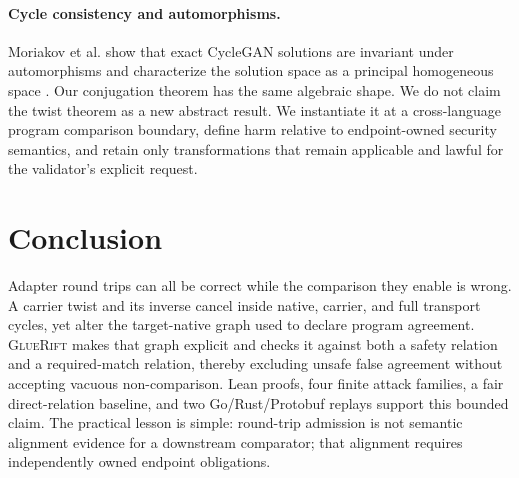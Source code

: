 \documentclass[sigconf,anonymous,review]{acmart}
\newcommand{\sys}{\textsc{GlueRift}\xspace}
\begin{document}
\paragraph{Cycle consistency and automorphisms.}
Moriakov et al. show that exact CycleGAN solutions are invariant under
automorphisms and characterize the solution space as a principal
homogeneous space \cite{moriakov2020cyclegan}.  Our conjugation theorem
has the same algebraic shape.  We do not claim the twist theorem as a
new abstract result.  We instantiate it at a cross-language program
comparison boundary, define harm relative to endpoint-owned security
semantics, and retain only transformations that remain applicable and
lawful for the validator's explicit request.

\section{Conclusion}

Adapter round trips can all be correct while the comparison they enable
is wrong.  A carrier twist and its inverse cancel inside native,
carrier, and full transport cycles, yet alter the target-native graph
used to declare program agreement.  \sys makes that graph explicit and
checks it against both a safety relation and a required-match relation,
thereby excluding unsafe false agreement without accepting vacuous
non-comparison.  Lean proofs, four finite attack families, a fair
direct-relation baseline, and two Go/Rust/Protobuf replays support this
bounded claim.  The practical lesson is simple: round-trip admission is
not semantic alignment evidence for a downstream comparator; that
alignment requires independently owned endpoint obligations.



\end{document}
